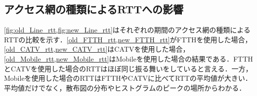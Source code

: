 \subsection{アクセス網の種類によるRTTへの影響}
\cref{fig:old_Line_rtt,fig:new_Line_rtt}はそれぞれの期間のアクセス網の種類によるRTTの比較を示す．\cref{old_FTTH_rtt,new_FTTH_rtt}がFTTHを使用した場合，\cref{old_CATV_rtt,new_CATV_rtt}はCATVを使用した場合，\cref{old_Mobile_rtt,new_Mobile_rtt}はMobileを使用した場合の結果である．FTTHとCATVを使用した場合のRTTはほぼ同じ振る舞いをしていると言える．一方，Mobileを使用した場合のRTTはFTTHやCATVに比べてRTTの平均値が大きい．平均値だけでなく，散布図の分布やヒストグラムのピークの場所からわかる．

